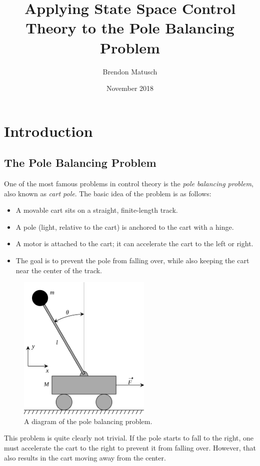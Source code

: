 \documentclass[12pt]{article}
\begin{document}
\title{Applying State Space Control Theory to the Pole Balancing Problem}
\author{Brendon Matusch}
\date{November 2018}
\maketitle

\section{Introduction}

\subsection{The Pole Balancing Problem}

One of the most famous problems in control theory is the \textit{pole balancing problem}, also known as \textit{cart pole}. The basic idea of the problem is as follows:
\begin{itemize}
    \item A movable cart sits on a straight, finite-length track.
    \item A pole (light, relative to the cart) is anchored to the cart with a hinge.
    \item A motor is attached to the cart; it can accelerate the cart to the left or right.
    \item The goal is to prevent the pole from falling over, while also keeping the cart near the center of the track.
\end{itemize}

\begin{figure}[h]
    \centering
    \includegraphics[width=180pt]{cartpole}
    \caption{\label{cartpole} A diagram of the pole balancing problem.}
\end{figure}

This problem is quite clearly not trivial. If the pole starts to fall to the right, one must accelerate the cart to the right to prevent it from falling over. However, that also results in the cart moving away from the center.
\end{document}
